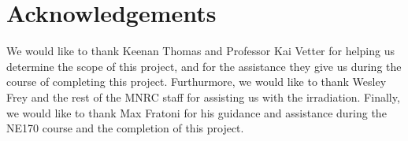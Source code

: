 \documentclass[]{article}
\begin{document}
\pagebreak

\section{Acknowledgements}

We would like to thank Keenan Thomas and Professor Kai Vetter for helping us determine the scope of this project, and for the assistance they give us during the course of completing this project. Furthurmore, we would like to thank Wesley Frey and the rest of the MNRC staff for assisting us with the irradiation. Finally, we would like to thank Max Fratoni for his guidance and assistance during the NE170 course and the completion of this project.
\end{document}
